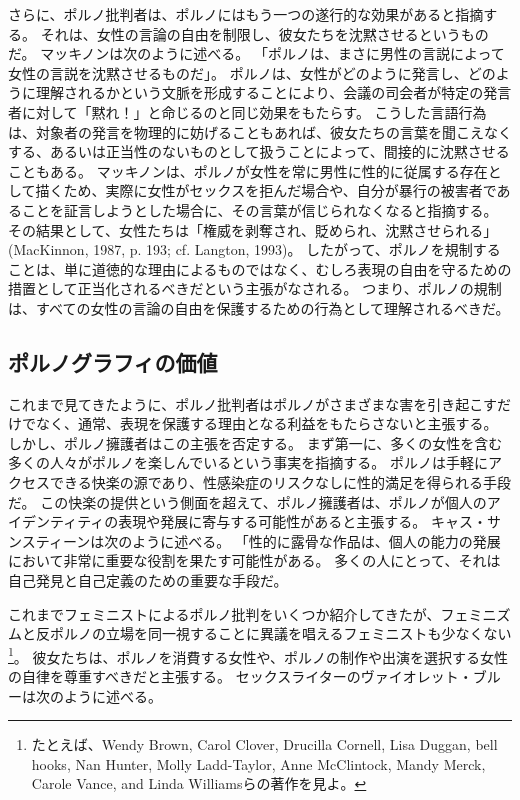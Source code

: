 \documentclass[paper=a4,book,openany]{jlreq} \usepackage{mystyle}
\begin{document}
さらに、ポルノ批判者は、ポルノにはもう一つの遂行的な効果があると指摘する。
それは、女性の言論の自由を制限し、彼女たちを沈黙させるというものだ。
マッキノンは次のように述べる。
「ポルノは、まさに男性の言説によって女性の言説を沈黙させるものだ」\citep[pp. 209--209]{mackinnon87:_femin_unmod}。
ポルノは、女性がどのように発言し、どのように理解されるかという文脈を形成することにより、会議の司会者が特定の発言者に対して「黙れ！」と命じるのと同じ効果をもたらす。
こうした言語行為は、対象者の発言を物理的に妨げることもあれば、彼女たちの言葉を聞こえなくする、あるいは正当性のないものとして扱うことによって、間接的に沈黙させることもある。
マッキノンは、ポルノが女性を常に男性に性的に従属する存在として描くため、実際に女性がセックスを拒んだ場合や、自分が暴行の被害者であることを証言しようとした場合に、その言葉が信じられなくなると指摘する。
その結果として、女性たちは「権威を剥奪され、貶められ、沈黙させられる」(MacKinnon, 1987, p. 193; cf. Langton, 1993)\nocite{langton93:_speec_acts_and_unspeak_acts}。
したがって、ポルノを規制することは、単に道徳的な理由によるものではなく、むしろ表現の自由を守るための措置として正当化されるべきだという主張がなされる。
つまり、ポルノの規制は、すべての女性の言論の自由を保護するための行為として理解されるべきだ。

\subsection{ポルノグラフィの価値}

これまで見てきたように、ポルノ批判者はポルノがさまざまな害を引き起こすだけでなく、通常、表現を保護する理由となる利益をもたらさないと主張する。
しかし、ポルノ擁護者はこの主張を否定する。
まず第一に、多くの女性を含む多くの人々がポルノを楽しんでいるという事実を指摘する。
ポルノは手軽にアクセスできる快楽の源であり、性感染症のリスクなしに性的満足を得られる手段だ。
この快楽の提供という側面を超えて、ポルノ擁護者は、ポルノが個人のアイデンティティの表現や発展に寄与する可能性があると主張する。
キャス・サンスティーンは次のように述べる。
「性的に露骨な作品は、個人の能力の発展において非常に重要な役割を果たす可能性がある。
多くの人にとって、それは自己発見と自己定義のための重要な手段だ\citep[p.215]{sunstein95:_democ_probl_free_speec}。

これまでフェミニストによるポルノ批判をいくつか紹介してきたが、フェミニズムと反ポルノの立場を同一視することに異議を唱えるフェミニストも少なくない
\footnote{たとえば、Wendy Brown, Carol Clover, Drucilla Cornell, Lisa Duggan, bell hooks, Nan Hunter, Molly Ladd-Taylor, Anne McClintock, Mandy Merck, Carole Vance, and Linda Williamsらの著作を見よ。
}。
彼女たちは、ポルノを消費する女性や、ポルノの制作や出演を選択する女性の自律を尊重すべきだと主張する。
セックスライターのヴァイオレット・ブルーは次のように述べる。
\end{document}
